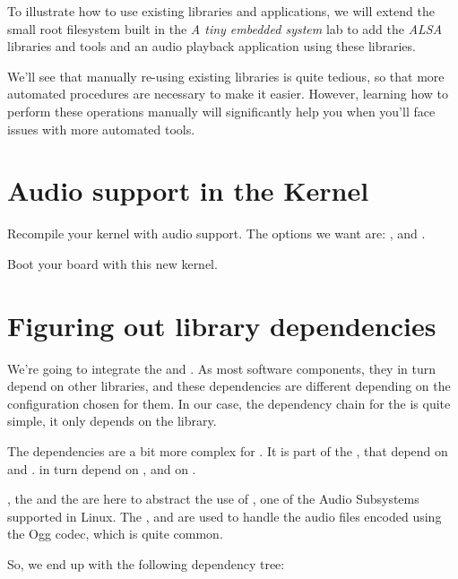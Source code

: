
To illustrate how to use existing libraries and applications, we will
extend the small root filesystem built in the {\em A tiny embedded
  system} lab to add the {\em ALSA} libraries and tools and an audio
playback application using these libraries.

We'll see that manually re-using existing libraries is quite tedious,
so that more automated procedures are necessary to make it
easier. However, learning how to perform these operations manually
will significantly help you when you'll face issues with more
automated tools.

\section{Audio support in the Kernel}

Recompile your kernel with audio support. The options we want are:
,  and
.

Boot your board with this new kernel.

\section{Figuring out library dependencies}

We're going to integrate the  and . As
most software components, they in turn depend on other libraries, and
these dependencies are different depending on the configuration chosen
for them. In our case, the dependency chain for the 
is quite simple, it only depends on the  library.

The dependencies are a bit more complex for . It is part
of the , that depend on  and
.  in turn depend on , and
 on .

, the  and the  are here
to abstract the use of , one of the Audio Subsystems
supported in Linux. The ,  and
 are used to handle the audio files encoded using the Ogg
codec, which is quite common.

So, we end up with the following dependency tree:

